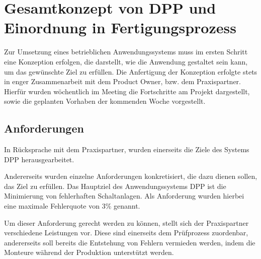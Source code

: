 \documentclass[
    type=Prakikumsbericht,
    status=draft, %
    language=german, %
    bibengine=bibtex,
]{unibwm-inf-thesis}
\begin{document}
    \chapter{Gesamtkonzept von \ac{DPP} und Einordnung in Fertigungsprozess}
    Zur Umsetzung eines betrieblichen Anwendungssystems muss im ersten Schritt eine Konzeption erfolgen, die darstellt,
    wie die Anwendung gestaltet sein kann, um das gewünschte Ziel zu erfüllen.
    Die Anfertigung der Konzeption erfolgte stets in enger Zusammenarbeit mit dem Product Owner, bzw. dem Praxispartner.
    Hierfür wurden wöchentlich im Meeting die Fortschritte am Projekt dargestellt, sowie die geplanten Vorhaben der kommenden Woche vorgestellt.

    \section{Anforderungen}
    In Rücksprache mit dem Praxispartner, wurden einerseits die Ziele des Systems \ac{DPP} herausgearbeitet.

    Andererseits wurden einzelne Anforderungen konkretisiert, die dazu dienen sollen, das Ziel zu erfüllen.
    Das Hauptziel des Anwendungssystems \ac{DPP} ist die Minimierung von fehlerhaften Schaltanlagen.
    Als Anforderung wurden hierbei eine maximale Fehlerquote von 3\% genannt.

    Um dieser Anforderung gerecht werden zu können, stellt sich der Praxispartner verschiedene Leistungen vor.
    Diese sind einerseits dem Prüfprozess zuordenbar, andererseits soll bereits die Entstehung von Fehlern vermieden
    werden, indem die Monteure während der Produktion unterstützt werden.
\end{document}
